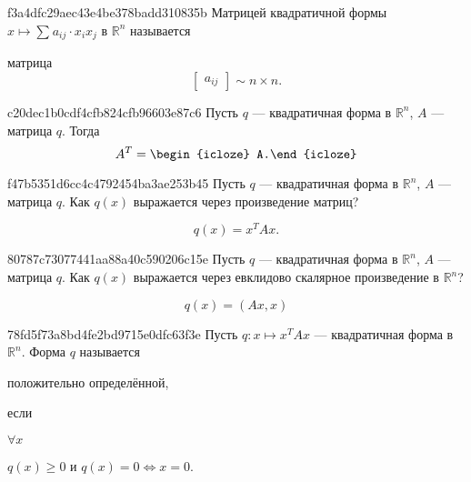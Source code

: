 \begin{note}{f3a4dfc29aec43e4be378badd310835b}
    Матрицей квадратичной формы \({ x \mapsto  \sum_{}^{} a_{ij} \cdot x_i x_j }\) в \({ \mathbb R^{n} }\) называется
    \begin{icloze}{1}
        матрица
        \[
            \begin{bmatrix}
                a_{ij}
            \end{bmatrix}
            \sim n \times n.
        \]
    \end{icloze}
\end{note}

\begin{note}{c20dec1b0cdf4cfb824cfb96603e87c6}
    Пусть \({ q }\) --- квадратичная форма в \({ \mathbb R^{n} }\), \({ A }\) --- матрица \({ q }\).
    Тогда
    \[
        A^{T} = \begin{icloze}{1}A.\end{icloze}
    \]
\end{note}

\begin{note}{f47b5351d6cc4c4792454ba3ae253b45}
    Пусть \({ q }\) --- квадратичная форма в \({ \mathbb R^{n} }\), \({ A }\) --- матрица \({ q }\).
    Как \({ q(x) }\) выражается через произведение матриц?

    \begin{cloze}{1}
        \[
            q(x) = x^{T}Ax.
        \]
    \end{cloze}
\end{note}

\begin{note}{80787c73077441aa88a40c590206c15e}
    Пусть \({ q }\) --- квадратичная форма в \({ \mathbb R^{n} }\), \({ A }\) --- матрица \({ q }\).
    Как \({ q(x) }\) выражается через евклидово скалярное произведение в \({ \mathbb R^{n} }\)?

    \begin{cloze}{1}
        \[
            q(x) = (Ax, x)
        \]
    \end{cloze}
\end{note}

\begin{note}{78fd5f73a8bd4fe2bd9715e0dfc63f3e}
    Пусть \({ q : x \mapsto x^{T}Ax }\) --- квадратичная форма в \({ \mathbb R^{n} }\).
    Форма \({ q }\) называется \begin{icloze}{2}положительно определённой,\end{icloze} если
    \begin{icloze}{1}
        \({ \forall x }\)
        \begin{center}
            \({ q(x) \geqslant 0 }\) \quad и \quad \({ q(x) = 0 \iff x = 0 }\).
        \end{center}
    \end{icloze}
\end{note}

